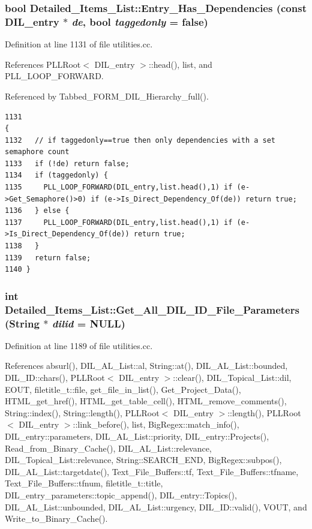 \subsubsection{\setlength{\rightskip}{0pt plus 5cm}bool Detailed\_\-Items\_\-List::Entry\_\-Has\_\-Dependencies (const {\bf DIL\_\-entry} $\ast$ {\em de}, bool {\em taggedonly} = {\bf false})}\label{classDetailed__Items__List_a0}




Definition at line 1131 of file utilities.cc.

References PLLRoot$<$ DIL\_\-entry $>$::head(), list, and PLL\_\-LOOP\_\-FORWARD.

Referenced by Tabbed\_\-FORM\_\-DIL\_\-Hierarchy\_\-full().



\footnotesize\begin{verbatim}1131                                                                                               {
1132   // if taggedonly==true then only dependencies with a set semaphore count
1133   if (!de) return false;
1134   if (taggedonly) {
1135     PLL_LOOP_FORWARD(DIL_entry,list.head(),1) if (e->Get_Semaphore()>0) if (e->Is_Direct_Dependency_Of(de)) return true;
1136   } else {
1137     PLL_LOOP_FORWARD(DIL_entry,list.head(),1) if (e->Is_Direct_Dependency_Of(de)) return true;
1138   }
1139   return false;
1140 }
\end{verbatim}\normalsize 
{}
\subsubsection{\setlength{\rightskip}{0pt plus 5cm}int Detailed\_\-Items\_\-List::Get\_\-All\_\-DIL\_\-ID\_\-File\_\-Parameters ({\bf String} $\ast$ {\em dilid} = NULL)}\label{classDetailed__Items__List_a2}




Definition at line 1189 of file utilities.cc.

References absurl(), DIL\_\-AL\_\-List::al, String::at(), DIL\_\-AL\_\-List::bounded, DIL\_\-ID::chars(), PLLRoot$<$ DIL\_\-entry $>$::clear(), DIL\_\-Topical\_\-List::dil, EOUT, filetitle\_\-t::file, get\_\-file\_\-in\_\-list(), Get\_\-Project\_\-Data(), HTML\_\-get\_\-href(), HTML\_\-get\_\-table\_\-cell(), HTML\_\-remove\_\-comments(), String::index(), String::length(), PLLRoot$<$ DIL\_\-entry $>$::length(), PLLRoot$<$ DIL\_\-entry $>$::link\_\-before(), list, Big\-Regex::match\_\-info(), DIL\_\-entry::parameters, DIL\_\-AL\_\-List::priority, DIL\_\-entry::Projects(), Read\_\-from\_\-Binary\_\-Cache(), DIL\_\-AL\_\-List::relevance, DIL\_\-Topical\_\-List::relevance, String::SEARCH\_\-END, Big\-Regex::subpos(), DIL\_\-AL\_\-List::targetdate(), Text\_\-File\_\-Buffers::tf, Text\_\-File\_\-Buffers::tfname, Text\_\-File\_\-Buffers::tfnum, filetitle\_\-t::title, DIL\_\-entry\_\-parameters::topic\_\-append(), DIL\_\-entry::Topics(), DIL\_\-AL\_\-List::unbounded, DIL\_\-AL\_\-List::urgency, DIL\_\-ID::valid(), VOUT, and Write\_\-to\_\-Binary\_\-Cache().

